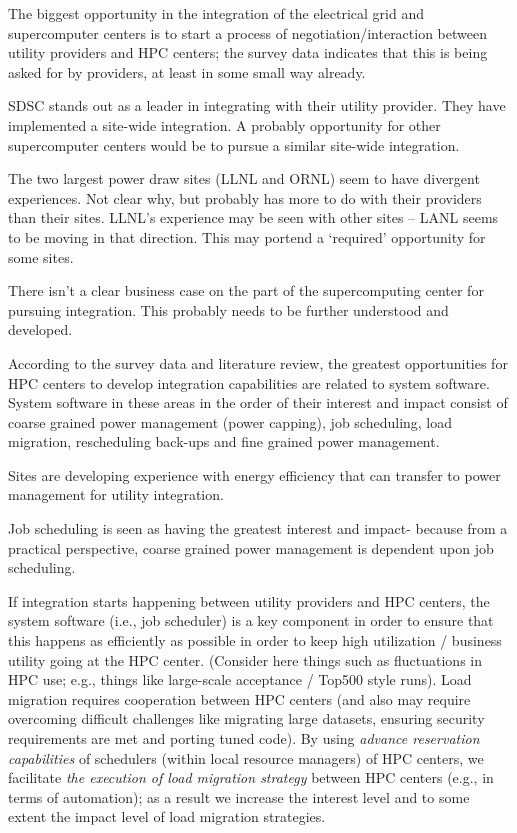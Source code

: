 The biggest opportunity in the integration of the electrical grid and supercomputer centers is to start a 
process of negotiation/interaction between utility providers and HPC centers; the survey data indicates 
that this is being asked for by providers, at least in some small way already.

SDSC stands out as a leader in integrating with their utility provider.  They have implemented a site-wide integration.  
A probably opportunity for other supercomputer centers would be to pursue a similar site-wide integration. 

The two largest power draw sites (LLNL and ORNL) seem to have divergent experiences.  
Not clear why, but probably has more to do with their providers than their sites.  
LLNL’s experience may be seen with other sites – LANL seems to be moving in that direction.  
This may portend a ‘required’ opportunity for some sites.

There isn’t a clear business case on the part of the supercomputing center for pursuing integration.
This probably needs to be further understood and developed.


According to the survey data and literature review, the greatest opportunities for HPC centers to develop 
integration capabilities
are related
to system software. System software in these areas in the order of their interest and impact 
consist of coarse grained power management (power capping), job scheduling, load migration,
rescheduling back-ups and 
fine grained power management.

Sites are developing experience with energy efficiency that can transfer to power management for utility integration.  

Job scheduling is seen as having the greatest interest and impact- because from a practical perspective, coarse grained power management is dependent upon job scheduling.


If integration starts happening between utility providers and HPC centers, 
the system software (i.e., job scheduler) is a key component in order to ensure that this happens
as efficiently as possible in order to keep high utilization / business utility going at the
HPC center.  (Consider here things such as fluctuations in HPC use; 
e.g., things like large-scale acceptance / Top500 style runs). 
Load migration requires cooperation between HPC centers (and also may require overcoming difficult
challenges like migrating large 
datasets, ensuring security requirements are met and porting tuned code). 
By using \textit{advance reservation capabilities} of schedulers (within local resource managers) of HPC centers, we facilitate \textit{the execution of load migration strategy} between HPC centers (e.g., in terms of automation); as a result we increase the interest level and to some extent the impact level of load migration strategies.

